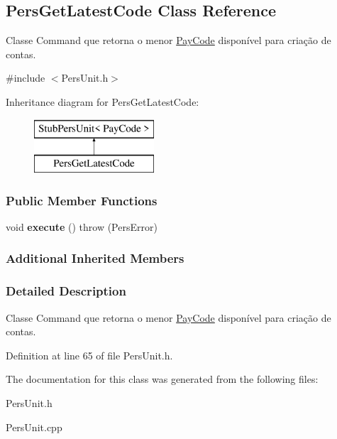 \hypertarget{classPersGetLatestCode}{\subsection{Pers\-Get\-Latest\-Code Class Reference}
\label{d8/d77/classPersGetLatestCode}
}


Classe Command que retorna o menor \hyperlink{classPayCode}{Pay\-Code} disponível para criação de contas.  




{\ttfamily \#include $<$Pers\-Unit.\-h$>$}

Inheritance diagram for Pers\-Get\-Latest\-Code\-:\begin{figure}[H]
\begin{center}
\leavevmode
\includegraphics[height=2.000000cm]{d8/d77/classPersGetLatestCode}
\end{center}
\end{figure}
\subsubsection*{Public Member Functions}
\begin{DoxyCompactItemize}
\item 
\hypertarget{classPersGetLatestCode_ad053433ea59b9c3caa4b1baf702add8f}{void {\bfseries execute} ()  throw (\-Pers\-Error)}\label{d8/d77/classPersGetLatestCode_ad053433ea59b9c3caa4b1baf702add8f}

\end{DoxyCompactItemize}
\subsubsection*{Additional Inherited Members}


\subsubsection{Detailed Description}
Classe Command que retorna o menor \hyperlink{classPayCode}{Pay\-Code} disponível para criação de contas. 

Definition at line 65 of file Pers\-Unit.\-h.



The documentation for this class was generated from the following files\-:\begin{DoxyCompactItemize}
\item 
Pers\-Unit.\-h\item 
Pers\-Unit.\-cpp\end{DoxyCompactItemize}
